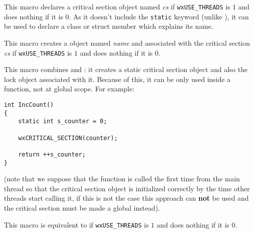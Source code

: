 \label{wxcritsectdeclaremember}


This macro declares a critical section object named {\it cs} if
{\tt wxUSE\_THREADS} is $1$ and does nothing if it is $0$. As it doesn't
include the {\tt static} keyword (unlike
), it can be used to declare
a class or struct member which explains its name.



\label{wxcritsectlocker}


This macro creates a 
object named {\it name} and associated with the critical section {\it cs} if
{\tt wxUSE\_THREADS} is $1$ and does nothing if it is $0$.



\label{wxcriticalsectionmacro}


This macro combines  and
: it creates a static critical
section object and also the lock object associated with it. Because of this, it
can be only used inside a function, not at global scope. For example:

\begin{verbatim}
int IncCount()
{
    static int s_counter = 0;

    wxCRITICAL_SECTION(counter);

    return ++s_counter;
}
\end{verbatim}

(note that we suppose that the function is called the first time from the main
thread so that the critical section object is initialized correctly by the time
other threads start calling it, if this is not the case this approach can
{\bf not} be used and the critical section must be made a global instead).



\label{wxentercritsect}


This macro is equivalent to  if
{\tt wxUSE\_THREADS} is $1$ and does nothing if it is $0$.



